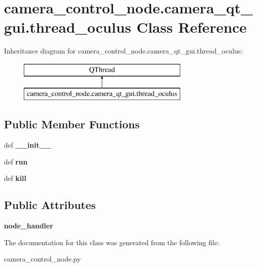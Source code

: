 \hypertarget{classcamera__control__node_1_1camera__qt__gui_1_1thread__oculus}{\section{camera\-\_\-control\-\_\-node.\-camera\-\_\-qt\-\_\-gui.\-thread\-\_\-oculus Class Reference}
\label{classcamera__control__node_1_1camera__qt__gui_1_1thread__oculus}
}
Inheritance diagram for camera\-\_\-control\-\_\-node.\-camera\-\_\-qt\-\_\-gui.\-thread\-\_\-oculus\-:\begin{figure}[H]
\begin{center}
\leavevmode
\includegraphics[height=2.000000cm]{classcamera__control__node_1_1camera__qt__gui_1_1thread__oculus}
\end{center}
\end{figure}
\subsection*{Public Member Functions}
\begin{DoxyCompactItemize}
\item 
\hypertarget{classcamera__control__node_1_1camera__qt__gui_1_1thread__oculus_a7d9f273fd95b03cf27040d46b38e8b07}{def {\bfseries \-\_\-\-\_\-init\-\_\-\-\_\-}}\label{classcamera__control__node_1_1camera__qt__gui_1_1thread__oculus_a7d9f273fd95b03cf27040d46b38e8b07}

\item 
\hypertarget{classcamera__control__node_1_1camera__qt__gui_1_1thread__oculus_a10a4701163d581d41976cb42b8661e50}{def {\bfseries run}}\label{classcamera__control__node_1_1camera__qt__gui_1_1thread__oculus_a10a4701163d581d41976cb42b8661e50}

\item 
\hypertarget{classcamera__control__node_1_1camera__qt__gui_1_1thread__oculus_a0c0bcd2e785caf1113d81b31d39344da}{def {\bfseries kill}}\label{classcamera__control__node_1_1camera__qt__gui_1_1thread__oculus_a0c0bcd2e785caf1113d81b31d39344da}

\end{DoxyCompactItemize}
\subsection*{Public Attributes}
\begin{DoxyCompactItemize}
\item 
\hypertarget{classcamera__control__node_1_1camera__qt__gui_1_1thread__oculus_aecc2e1ef045069903ea44b3a0b4776df}{{\bfseries node\-\_\-handler}}\label{classcamera__control__node_1_1camera__qt__gui_1_1thread__oculus_aecc2e1ef045069903ea44b3a0b4776df}

\end{DoxyCompactItemize}


The documentation for this class was generated from the following file\-:\begin{DoxyCompactItemize}
\item 
camera\-\_\-control\-\_\-node.\-py\end{DoxyCompactItemize}
